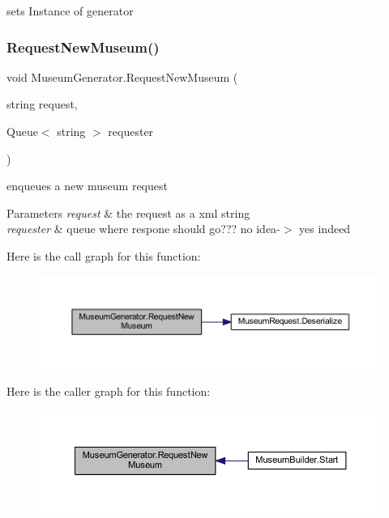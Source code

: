 sets Instance of generator 

\mbox{\label{class_museum_generator_a5ead852effaa81309fe98b4d61fe9759}} 
\subsubsection{\texorpdfstring{Request\+New\+Museum()}{RequestNewMuseum()}}
{\footnotesize\ttfamily void Museum\+Generator.\+Request\+New\+Museum (\begin{DoxyParamCaption}\item[{string}]{request,  }\item[{Queue$<$ string $>$}]{requester }\end{DoxyParamCaption})}



enqueues a new museum request 


\begin{DoxyParams}{Parameters}
{\em request} & the request as a xml string\\
\hline
{\em requester} & queue where respone should go??? no idea-\/$>$ yes indeed\\
\hline
\end{DoxyParams}
Here is the call graph for this function\+:
\nopagebreak
\begin{figure}[H]
\begin{center}
\leavevmode
\includegraphics[width=350pt]{class_museum_generator_a5ead852effaa81309fe98b4d61fe9759_cgraph}
\end{center}
\end{figure}
Here is the caller graph for this function\+:
\nopagebreak
\begin{figure}[H]
\begin{center}
\leavevmode
\includegraphics[width=350pt]{class_museum_generator_a5ead852effaa81309fe98b4d61fe9759_icgraph}
\end{center}
\end{figure}
\mbox{\label{class_museum_generator_afa0b7c3e8ab1bccedc4c7828cbf4724e}} 
